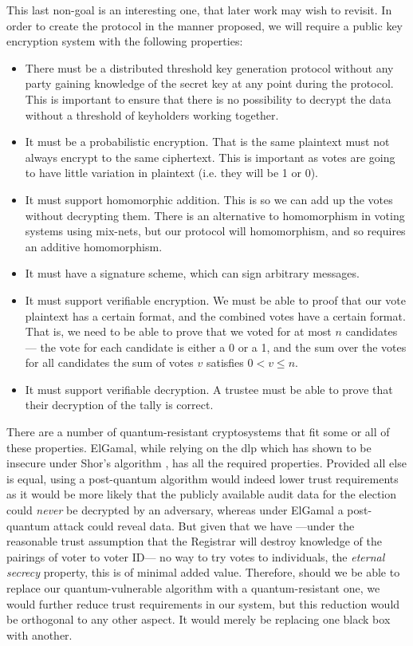 This last non-goal is an interesting one, that later work may wish to revisit. In order to create the protocol in the manner proposed, we will require a public key encryption system with the following properties:

\begin{itemize}
    \item There must be a distributed threshold key generation protocol without any party gaining knowledge of the secret key at any point during the protocol. This is important to ensure that there is no possibility to decrypt the data without a threshold of keyholders working together.
    \item It must be a probabilistic encryption. That is the same plaintext must not always encrypt to the same ciphertext. This is important as votes are going to have little variation in plaintext (i.e. they will be 1 or 0).
    \item It must support homomorphic addition. This is so we can add up the votes without decrypting them. There is an alternative to homomorphism in voting systems using mix-nets, but our protocol will homomorphism, and so requires an additive homomorphism.
    \item It must have a signature scheme, which can sign arbitrary messages.
    \item It must support verifiable encryption. We must be able to proof that our vote plaintext has a certain format, and the combined votes have a certain format. That is, we need to be able to prove that we voted for at most $n$ candidates --- the vote for each candidate is either a 0 or a 1, and the sum over the votes for all candidates the sum of votes $v$ satisfies $0 < v \leq n$.
    \item It must support verifiable decryption. A trustee must be able to prove that their decryption of the tally is correct.
\end{itemize}

There are a number of quantum-resistant cryptosystems \cite{regevLatticesLearningErrors2009,gentryFullyHomomorphicEncryption2009,hoffsteinNTRURingbasedPublic1998,feoQuantumresistantCryptosystemsSupersingular2011} that fit some or all of these properties. ElGamal, while relying on the \gls{dlp} which has shown to be insecure under Shor's algorithm \cite{shorAlgorithmsQuantumComputation1994}, has all the required properties. Provided all else is equal, using a post-quantum algorithm would indeed lower trust requirements as it would be more likely that the publicly available audit data for the election could \emph{never} be decrypted by an adversary, whereas under ElGamal a post-quantum attack could reveal data. But given that we have ---under the reasonable trust assumption that the Registrar will destroy knowledge of the pairings of voter to voter ID--- no way to try votes to individuals, the \emph{eternal secrecy} property, this is of minimal added value. Therefore, should we be able to replace our quantum-vulnerable algorithm with a quantum-resistant one, we would further reduce trust requirements in our system, but this reduction would be orthogonal to any other aspect. It would merely be replacing one black box with another.

